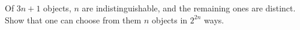 Of $3n + 1$ objects, $n$ are indistinguishable, and the remaining ones are distinct. Show that one can choose from them $n$ objects in $2^{2n}$ ways.
